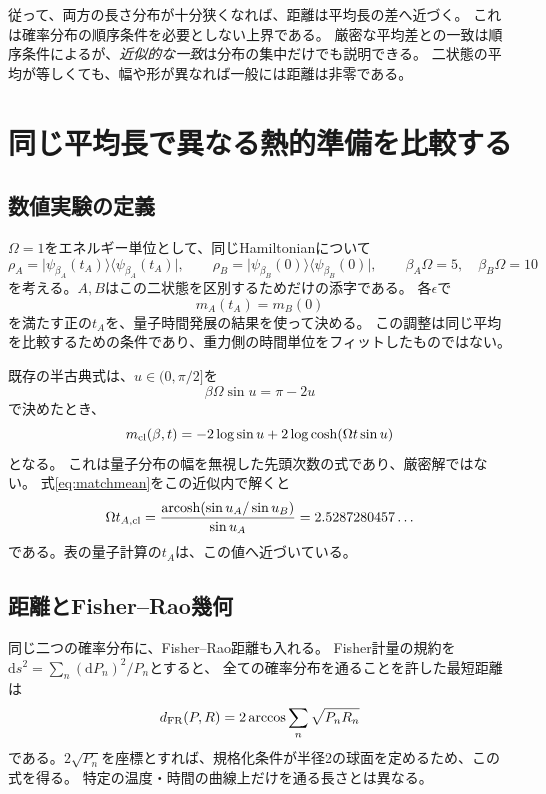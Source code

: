 \documentclass[a4paper,11pt]{ltjsarticle}
\numberwithin{equation}{section}
\newcommand{\ket}[1]{\lvert #1\rangle}
\newcommand{\bra}[1]{\langle #1\rvert}
\newcommand{\dd}{\mathrm d}
\begin{document}
従って、両方の長さ分布が十分狭くなれば、距離は平均長の差へ近づく。
これは確率分布の順序条件を必要としない上界である。
厳密な平均差との一致は順序条件によるが、\emph{近似的な一致}は分布の集中だけでも説明できる。
二状態の平均が等しくても、幅や形が異なれば一般には距離は非零である。

\section{同じ平均長で異なる熱的準備を比較する}
\subsection{数値実験の定義}
$\Omega=1$をエネルギー単位として、同じHamiltonianについて
\begin{equation}
 \rho_A=\ket{\psi_{\beta_A}(t_A)}\bra{\psi_{\beta_A}(t_A)},\qquad
 \rho_B=\ket{\psi_{\beta_B}(0)}\bra{\psi_{\beta_B}(0)},\qquad
 \beta_A\Omega=5,\quad\beta_B\Omega=10
 \label{eq:pair}
\end{equation}
を考える。$A,B$はこの二状態を区別するためだけの添字である。
各$\epsilon$で
\begin{equation}
 m_A(t_A)=m_B(0)
 \label{eq:matchmean}
\end{equation}
を満たす正の$t_A$を、量子時間発展の結果を使って決める。
この調整は同じ平均を比較するための条件であり、重力側の時間単位をフィットしたものではない。

既存の半古典式は、$u\in(0,\pi/2]$を
\begin{equation}
 \beta\Omega\sin u=\pi-2u
 \label{eq:saddle}
\end{equation}
で決めたとき、
\begin{equation}
 m_{\rm cl}(\beta,t)=-2\log\sin u+2\log\cosh(\Omega t\sin u)
 \label{eq:classical}
\end{equation}
となる\cite{Heller}。
これは量子分布の幅を無視した先頭次数の式であり、厳密解ではない。
式\eqref{eq:matchmean}をこの近似内で解くと
\begin{equation}
 \Omega t_{A,\rm cl}
 =\frac{\operatorname{arcosh}(\sin u_A/\sin u_B)}{\sin u_A}
 =2.5287280457\ldots
 \label{eq:classicalmatch}
\end{equation}
である。表の量子計算の$t_A$は、この値へ近づいている。

\subsection{距離とFisher--Rao幾何}
同じ二つの確率分布に、Fisher--Rao距離も入れる。
Fisher計量の規約を$\dd s^2=\sum_n(\dd P_n)^2/P_n$とすると、
全ての確率分布を通ることを許した最短距離は
\begin{equation}
 d_{\rm FR}(P,R)=2\arccos\sum_n\sqrt{P_nR_n}
 \label{eq:fisherrao}
\end{equation}
である。$2\sqrt{P_n}$を座標とすれば、規格化条件が半径2の球面を定めるため、この式を得る。
特定の温度・時間の曲線上だけを通る長さとは異なる。
\end{document}
